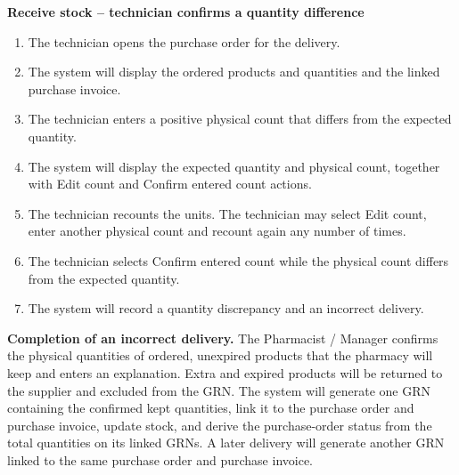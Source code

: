\textbf{Receive stock -- technician confirms a quantity difference}
\begin{enumerate}
\item The technician opens the purchase order for the delivery.
\item The system will display the ordered products and quantities and the linked purchase invoice.
\item The technician enters a positive physical count that differs from the expected quantity.
\item The system will display the expected quantity and physical count, together with Edit count and Confirm entered count actions.
\item The technician recounts the units. The technician may select Edit count, enter another physical count and recount again any number of times.
\item The technician selects Confirm entered count while the physical count differs from the expected quantity.
\item The system will record a quantity discrepancy and an incorrect delivery.
\end{enumerate}

\textbf{Completion of an incorrect delivery.} The Pharmacist / Manager confirms the physical quantities of ordered, unexpired products that the pharmacy will keep and enters an explanation. Extra and expired products will be returned to the supplier and excluded from the GRN. The system will generate one GRN containing the confirmed kept quantities, link it to the purchase order and purchase invoice, update stock, and derive the purchase-order status from the total quantities on its linked GRNs. A later delivery will generate another GRN linked to the same purchase order and purchase invoice.

\clearpage

